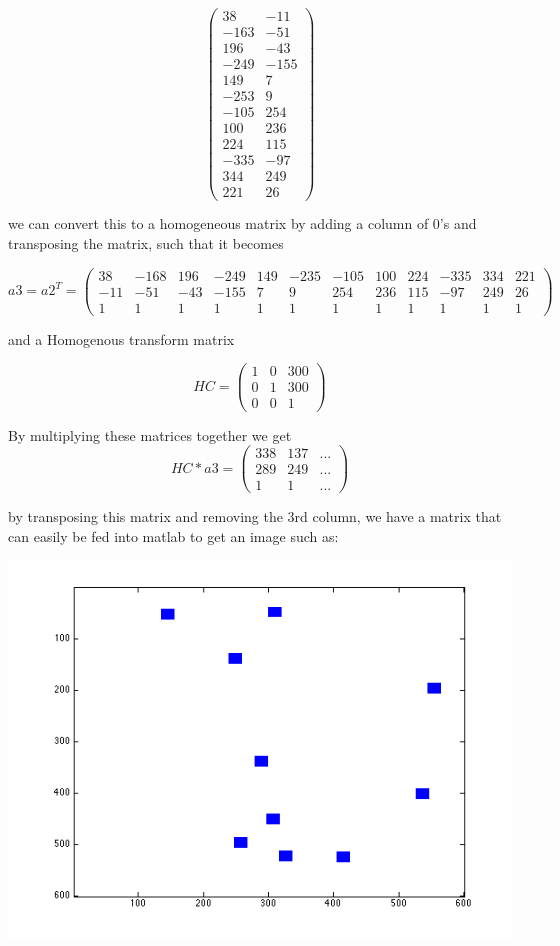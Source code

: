 \documentclass[a4paper,12pt]{article}
\begin{document}
\[ \left ( \begin{array}{cc}
38 & -11 \\
-163 & -51 \\
196 & -43 \\
-249 & -155 \\
149 & 7 \\
-253 & 9 \\
-105 & 254 \\
100 & 236 \\
 224 & 115 \\
-335 & -97 \\
344 & 249 \\
221 & 26 \end{array} \right ) \]

we can convert this to a homogeneous matrix by adding a column of 0's and transposing the matrix, such that it becomes

\[ a3 = a2^T =  \left ( \begin{array}{cccccccccccc}
38 & -168 & 196 & -249 & 149 & -235 & -105 & 100 & 224 & -335 & 334 & 221\\
-11 & -51 & -43 & -155 & 7 & 9 & 254 & 236 & 115 & -97 & 249 & 26 \\
1 & 1 & 1 & 1 & 1 & 1 & 1 & 1 & 1 & 1 & 1 & 1 \end{array} \right ) \] 

and a Homogenous transform matrix

\[ HC = \left( \begin{array}{ccc}
1 & 0 & 300\\
0 & 1 & 300\\
0 & 0 & 1\end{array} \right ) \]

By multiplying these matrices together we get
\[ HC * a3  = \left ( \begin{array}{ccc}
338 & 137 &...\\
289 &  249 &...\\
1 &  1 &... \end{array} \right ) \]


by transposing this matrix and removing the 3rd column, we have a matrix that can easily be fed into matlab to get an image such as:

\includegraphics[scale=.5]{q2_2.png}
\end{document}
